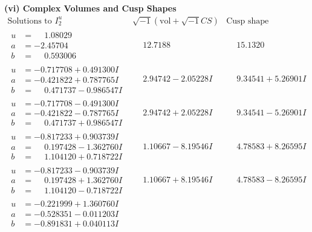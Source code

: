 \documentclass[1p]{elsarticle_modified}
\theoremstyle{definition}
\newcommand{\I}{\sqrt{-1}}
\begin{document}
\newpage\flushleft \textbf{(vi) Complex Volumes and Cusp Shapes}
$$\begin{array}{c|c|c}  
\text{Solutions to }I^u_{2}& \I (\text{vol} + \sqrt{-1}CS) & \text{Cusp shape}\\
 \hline 
\begin{aligned}
u &= \phantom{-}1.08029\phantom{ +0.000000I} \\
a &= -2.45704\phantom{ +0.000000I} \\
b &= \phantom{-}0.593006\phantom{ +0.000000I}\end{aligned}
 & \phantom{-}12.7188\phantom{ +0.000000I} & \phantom{-}15.1320\phantom{ +0.000000I} \\ \hline\begin{aligned}
u &= -0.717708 + 0.491300 I \\
a &= -0.421822 + 0.787765 I \\
b &= \phantom{-}0.471737 - 0.986547 I\end{aligned}
 & \phantom{-}2.94742 - 2.05228 I & \phantom{-}9.34541 + 5.26901 I \\ \hline\begin{aligned}
u &= -0.717708 - 0.491300 I \\
a &= -0.421822 - 0.787765 I \\
b &= \phantom{-}0.471737 + 0.986547 I\end{aligned}
 & \phantom{-}2.94742 + 2.05228 I & \phantom{-}9.34541 - 5.26901 I \\ \hline\begin{aligned}
u &= -0.817233 + 0.903739 I \\
a &= \phantom{-}0.197428 - 1.362760 I \\
b &= \phantom{-}1.104120 + 0.718722 I\end{aligned}
 & \phantom{-}1.10667 - 8.19546 I & \phantom{-}4.78583 + 8.26595 I \\ \hline\begin{aligned}
u &= -0.817233 - 0.903739 I \\
a &= \phantom{-}0.197428 + 1.362760 I \\
b &= \phantom{-}1.104120 - 0.718722 I\end{aligned}
 & \phantom{-}1.10667 + 8.19546 I & \phantom{-}4.78583 - 8.26595 I \\ \hline\begin{aligned}
u &= -0.221999 + 1.360760 I \\
a &= -0.528351 - 0.011203 I \\
b &= -0.891831 + 0.040113 I\end{aligned}

\end{array}$$
\end{document}
